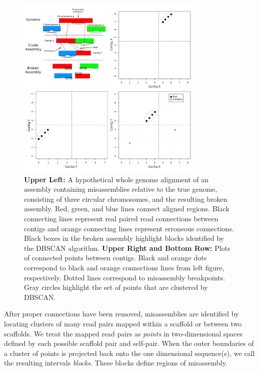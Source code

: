\documentclass{bioinfo}
\begin{document}
\begin{figure}[t]
\includegraphics[width=3.5in]{fish-qc.pdf}
\vspace{-1cm}
\caption{\textbf{Upper Left:}  A hypothetical whole genome alignment of an assembly containing misassemblies relative to the true genome,
consisting of three circular chromosomes, and the 
resulting broken assembly. Red, green, and blue lines connect aligned regions. Black connecting lines represent real paired read 
connections between contigs and orange connecting lines represent erroneous connections. Black boxes in the broken assembly highlight
blocks identified by the DBSCAN algorithm. \textbf{Upper Right and Bottom Row:} Plots of connected points between contigs. Black and orange dots 
correspond to black and orange connections lines from left figure, respectively. Dotted lines correspond
to misassembly breakpoints. Gray circles highlight the set of points that are clustered by DBSCAN. }\label{fig:02}
\end{figure}

After proper connections have been removed, misassemblies are identified by locating clusters of many read pairs mapped within
a scaffold or between two scaffolds. We treat the mapped read pairs as \emph{points} in
two-dimensional spaces defined by each possible scaffold pair and self-pair. When the outer boundaries of a cluster of points
is projected back onto the one dimensional sequence(s), we call the resulting intervals \emph{blocks}.
These blocks define regions of misassembly.
\end{document}
